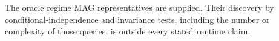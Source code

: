 The oracle regime MAG representatives are supplied.  Their discovery by conditional-independence and invariance tests, including the number or complexity of those queries, is outside every stated runtime claim.